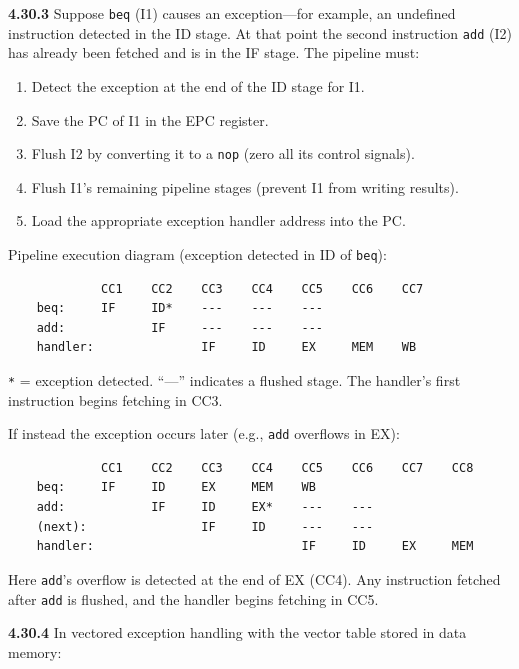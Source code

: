 \medskip\noindent\textbf{4.30.3}
Suppose \texttt{beq} (I1) causes an exception---for example, an undefined
instruction detected in the ID stage.  At that point the second instruction
\texttt{add} (I2) has already been fetched and is in the IF stage.  The
pipeline must:

\begin{enumerate}
\item Detect the exception at the end of the ID stage for I1.
\item Save the PC of I1 in the EPC register.
\item Flush I2 by converting it to a \texttt{nop} (zero all its control
      signals).
\item Flush I1's remaining pipeline stages (prevent I1 from writing results).
\item Load the appropriate exception handler address into the PC.
\end{enumerate}

\noindent Pipeline execution diagram (exception detected in ID of \texttt{beq}):

\begin{verbatim}
             CC1    CC2    CC3    CC4    CC5    CC6    CC7
    beq:     IF     ID*    ---    ---    ---
    add:            IF     ---    ---    ---
    handler:               IF     ID     EX     MEM    WB
\end{verbatim}

\noindent \texttt{*} = exception detected. ``---'' indicates a flushed stage.
The handler's first instruction begins fetching in CC3.

If instead the exception occurs later (e.g., \texttt{add} overflows in EX):

\begin{verbatim}
             CC1    CC2    CC3    CC4    CC5    CC6    CC7    CC8
    beq:     IF     ID     EX     MEM    WB
    add:            IF     ID     EX*    ---    ---
    (next):                IF     ID     ---    ---
    handler:                             IF     ID     EX     MEM
\end{verbatim}

\noindent Here \texttt{add}'s overflow is detected at the end of EX (CC4).
Any instruction fetched after \texttt{add} is flushed, and the handler begins
fetching in CC5.

\medskip\noindent\textbf{4.30.4}
In vectored exception handling with the vector table stored in data memory:

